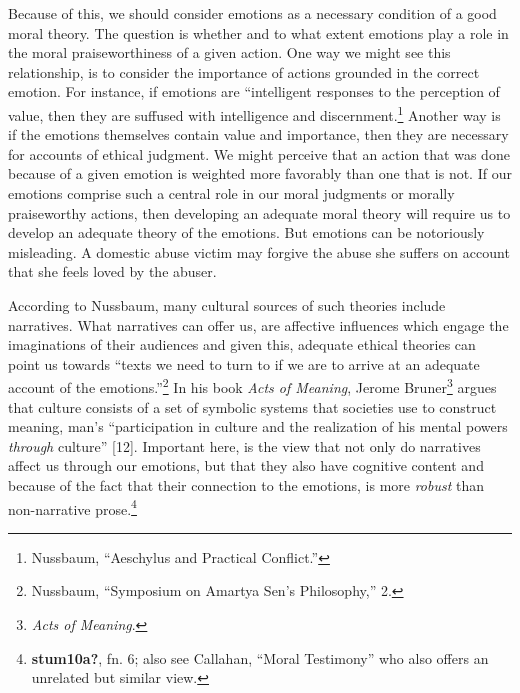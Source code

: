 \documentclass[phdthesis,12pt,final]{wuthesis}
\theoremstyle{definition}
\theoremstyle{definition}
\theoremstyle{definition}
\theoremstyle{definition}
\theoremstyle{remark}
\begin{document}
Because of this, we should consider emotions as a necessary condition of a good moral theory. The question is whether and to what extent emotions play a role in the moral praiseworthiness of a given action. One way we might see this relationship, is to consider the importance of actions grounded in the correct emotion. For instance, if emotions are ``intelligent responses to the perception of value, then they are suffused with intelligence and discernment.\footnote{Nussbaum, {``Aeschylus and Practical Conflict.''}} Another way is if the emotions themselves contain value and importance, then they are necessary for accounts of ethical judgment. We might perceive that an action that was done because of a given emotion is weighted more favorably than one that is not. If our emotions comprise such a central role in our moral judgments or morally praiseworthy actions, then developing an adequate moral theory will require us to develop an adequate theory of the emotions. But emotions can be notoriously misleading. A domestic abuse victim may forgive the abuse she suffers on account that she feels loved by the abuser.

According to Nussbaum, many cultural sources of such theories include narratives. What narratives can offer us, are affective influences which engage the imaginations of their audiences and given this, adequate ethical theories can point us towards ``texts we need to turn to if we are to arrive at an adequate account of the emotions.''\footnote{Nussbaum, {``Symposium on {Amartya Sen}'s Philosophy,''} 2.} In his book \emph{Acts of Meaning}, Jerome Bruner\footnote{\emph{Acts of Meaning}.} argues that culture consists of a set of symbolic systems that societies use to construct meaning, man's ``participation in culture and the realization of his mental powers \emph{through} culture'' {[}12{]}. Important here, is the view that not only do narratives affect us through our emotions, but that they also have cognitive content and because of the fact that their connection to the emotions, is more \emph{robust} than non-narrative prose.\footnote{\textbf{stum10a?}, fn. 6; also see Callahan, {``Moral {Testimony}''} who also offers an unrelated but similar view.}
\end{document}
